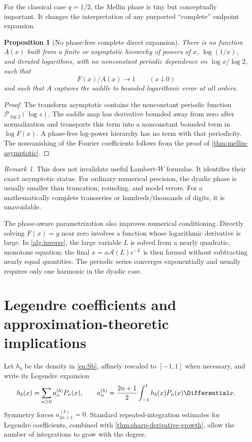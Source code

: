 \documentclass[11pt,oneside]{article}
\newtheorem{proposition}[theorem]{Proposition}
\theoremstyle{definition}
\theoremstyle{remark}
\newtheorem{remark}[theorem]{Remark}
\newcommand{\cP}{\mathcal P}
\newcommand{\cA}{\mathcal A}
\begin{document}
For the classical case $q=1/2$, the Mellin phase is tiny but conceptually important.
It changes the interpretation of any purported ``complete'' endpoint expansion.

\begin{proposition}[No phase-free complete direct expansion]
There is no function $A(x)$ built from a finite or asymptotic hierarchy of powers of
$x$, $\log(1/x)$, and iterated logarithms, with no nonconstant periodic dependence on
$\log x/\log2$, such that
\[
 F(x)/A(x)\longrightarrow1\qquad(x\downarrow0)
\]
and such that $A$ captures the saddle to bounded logarithmic error at all orders.
\end{proposition}

\begin{proof}
The transform asymptotic contains the nonconstant periodic function
$\cP_{\log2}(\log z)$.  The saddle map has derivative bounded away from zero after
normalization and transports this term into a nonconstant bounded term in
$\log F(x)$.  A phase-free log-power hierarchy has no term with that periodicity.
The nonvanishing of the Fourier coefficients follows from the proof of
\cref{thm:mellin-asymptotic}.
\end{proof}

\begin{remark}
This does not invalidate useful Lambert-$W$ formulas.  It identifies their exact
asymptotic status.  For ordinary numerical precision, the dyadic phase is usually
smaller than truncation, rounding, and model errors.  For a mathematically complete
transseries or hundreds/thousands of digits, it is unavoidable.
\end{remark}

The phase-aware parametrization also improves numerical conditioning.  Directly
solving $F(x)=y$ near zero involves a function whose logarithmic derivative is large.
In \cref{alg:inverse}, the large variable $L$ is solved from a nearly quadratic,
monotone equation; the final $x=a\cA(L)e^{-L}$ is then formed without subtracting
nearly equal quantities.  The periodic series converges exponentially and usually
requires only one harmonic in the dyadic case.

\section{Legendre coefficients and approximation-theoretic implications}
\label{sec:legendre}

Let $h_b$ be the density in \eqref{eq:Sb}, affinely rescaled to $[-1,1]$ when
necessary, and write its Legendre expansion
\begin{equation}
 h_b(x)=\sum_{n\ge0}a_n^{(b)}P_n(x),
 \qquad
 a_n^{(b)}=\frac{2n+1}{2}\int_{-1}^1h_b(x)P_n(x)\Differential x.
 \label{eq:legendre-expansion}
\end{equation}
Symmetry forces $a_{2n+1}^{(b)}=0$.  Standard repeated-integration estimates for
Legendre coefficients, combined with
\cref{thm:sharp-derivative-growth}, allow the number of integrations to grow with the
degree.
\end{document}
